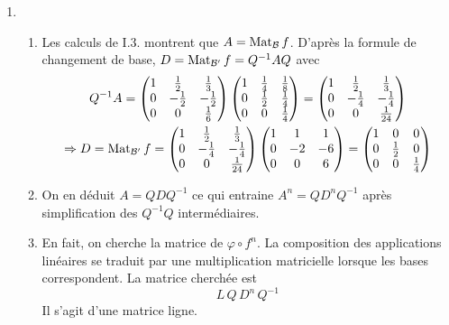 \begin{enumerate}
 \item 
\begin{enumerate}
\item  Les calculs de I.3. montrent que $A = \operatorname{Mat}_{\mathcal{B}} f$. D'après la formule de changement de base, $D = \operatorname{Mat}_{\mathcal{B}'} f = Q^{-1} A Q $ avec
\begin{multline*}
Q^{-1} A =
\begin{pmatrix}
 1 & \frac{1}{2} & \frac{1}{3}\\ 0 & -\frac{1}{2} & -\frac{1}{2} \\ 0 & 0 & \frac{1}{6} 
\end{pmatrix} 
\begin{pmatrix}
 1 & \frac{1}{4} & \frac{1}{8} \\
 0 & \frac{1}{2} & \frac{1}{4} \\
 0 & 0 & \frac{1}{4} 
\end{pmatrix}
=
\begin{pmatrix}
 1 & \frac{1}{2} & \frac{1}{3} \\ 
 0 & -\frac{1}{4} & -\frac{1}{4} \\
 0 &  0          & \frac{1}{24}
\end{pmatrix} \\
\Rightarrow
D = \operatorname{Mat}_{\mathcal{B}'} f=
\begin{pmatrix}
 1 & \frac{1}{2} & \frac{1}{3} \\ 
 0 & -\frac{1}{4} & -\frac{1}{4} \\
 0 &  0          & \frac{1}{24}
\end{pmatrix}
\begin{pmatrix}
 1 & 1 & 1 \\ 0 & -2 & -6 \\ 0 & 0 & 6
\end{pmatrix}
=
\begin{pmatrix}
 1 & 0 & 0 \\ 0 & \frac{1}{2} & 0 \\ 0 & 0 & \frac{1}{4}
\end{pmatrix}
\end{multline*}

\item On en déduit $A = Q D Q^{-1}$ ce qui entraine $A^n = Q D^n Q^{-1}$ après simplification des $Q^{-1}Q$ intermédiaires.

\item En fait, on cherche la matrice de $\varphi \circ f^n$. La composition des applications linéaires se traduit par une multiplication matricielle lorsque les bases correspondent. La matrice cherchée est
\begin{displaymath}
 L\,Q\,D^n\,Q^{-1}
\end{displaymath}
Il s'agit d'une matrice ligne.
\end{enumerate}


\end{enumerate}
